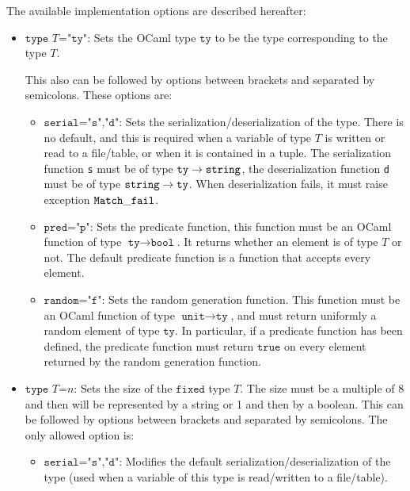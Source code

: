 The available implementation options are described hereafter:
\begin{itemize}
\item $\texttt{type }T\texttt{="ty"}$: Sets the OCaml type $\texttt{ty}$ to
  be the type corresponding to the type $T$. 

  This also can be followed by options between brackets and separated by
  semicolons. These options are:
  \begin{itemize}
  \item $\texttt{serial="s","d"}$: 
    Sets the serialization/deserialization of the type. There is no
    default, and this is required when a variable of type $T$ is written or
    read to a file/table, or when it is contained in a tuple.
    The serialization function \texttt{s} must be of type $\texttt{ty} \rightarrow {\tt string}$,
    the deserialization function \texttt{d} must be of type ${\tt string} \rightarrow \texttt{ty}$.
    When deserialization fails, it must raise exception ${\tt Match\_fail}$.

  \item $\texttt{pred="p"}$:
    Sets the predicate function, this function must be an OCaml function of
    type $\texttt{ty} \rightarrow \texttt{bool}$. It returns whether an
    element is of type $T$ or not. The default predicate function is a
    function that accepts every element.

  \item $\texttt{random="f"}$:
    Sets the random generation function. This function must be an OCaml
    function of type $\texttt{unit} \rightarrow \texttt{ty}$, and must
    return uniformly a random element of type $\texttt{ty}$. In particular,
    if a predicate function has been defined, the predicate function must
    return $\texttt{true}$ on every element returned by the random
    generation function.
  \end{itemize}
\item $\texttt{type }T\texttt{=}n$: Sets the size of the $\texttt{fixed}$
  type $T$. The size must be a multiple of 8 and then will be represented
  by a string or 1 and then by a boolean.
  This can be followed by options between brackets and separated
  by semicolons. The only allowed option is:
  \begin{itemize}
  \item $\texttt{serial="s","d"}$:
    Modifies the default serialization/deserialization of the type (used
    when a variable of this type is read/written to a file/table).
  \end{itemize}


\end{itemize}
